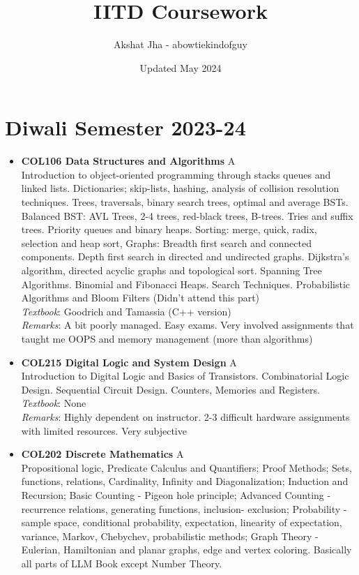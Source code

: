\documentclass[a4paper]{article}
\title{IITD Coursework}
\author{Akshat Jha - abowtiekindofguy}
\date{Updated May 2024}
\begin{document}
\maketitle
\section*{Diwali Semester 2023-24}
\begin{itemize}
    \item \textbf{COL106 Data Structures and Algorithms} {\color{red}A}
    \\
    Introduction to object-oriented programming through stacks queues and linked lists. Dictionaries; skip-lists, hashing, analysis of collision resolution techniques. Trees, traversals, binary search trees, optimal and average BSTs. Balanced BST: AVL Trees, 2-4 trees, red-black trees, B-trees. Tries and suffix trees. Priority queues and binary heaps. Sorting: merge, quick, radix, selection and heap sort, Graphs: Breadth first search and connected components. Depth first search in directed and undirected graphs. Dijkstra’s algorithm, directed acyclic graphs and topological sort. Spanning Tree Algorithms. Binomial and Fibonacci Heaps. Search Techniques. Probabilistic Algorithms and Bloom Filters (Didn't attend this part)
    \\
    \textit{Textbook}: Goodrich and Tamassia (C++ version)
    \\
    \textit{Remarks}: A bit poorly managed. Easy exams. Very involved assignments that taught me OOPS and memory management (more than algorithms)
    \item \textbf{COL215 Digital Logic and System Design} {\color{red}A}
    \\
    Introduction to Digital Logic and Basics of Transistors. Combinatorial Logic Design. Sequential Circuit Design. Counters, Memories and Registers. 
    \\
    \textit{Textbook}: None
    \\
    \textit{Remarks}: Highly dependent on instructor. 2-3 difficult hardware assignments with limited resources. Very subjective
    \item \textbf{COL202 Discrete Mathematics} {\color{red}A}
    \\
    Propositional logic, Predicate Calculus and Quantifiers; Proof Methods; Sets, functions, relations, Cardinality, Infinity and Diagonalization; Induction and Recursion; Basic Counting - Pigeon hole principle; Advanced Counting - recurrence relations, generating functions, inclusion- exclusion; Probability - sample space, conditional probability, expectation, linearity of expectation, variance, Markov, Chebychev, probabilistic methods; Graph Theory - Eulerian, Hamiltonian and planar graphs, edge and vertex coloring. Basically all parts of LLM Book except Number Theory.

\end{itemize}
\end{document}
